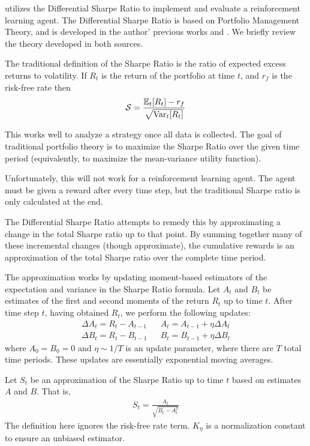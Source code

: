 \cite{drl_mvo} utilizes the Differential Sharpe Ratio to implement and evaluate a reinforcement learning agent.
The Differential Sharpe Ratio is based on Portfolio Management Theory, and is developed in the author' previous works \cite{diff_sharpe_ratio_paper} and \cite{diff_sharpe_ratio_book}.
We briefly review the theory developed in both sources.

The traditional definition of the Sharpe Ratio is the ratio of expected excess returns to volatility.
If $R_t$ is the return of the portfolio at time $t$, and $r_f$ is the risk-free rate then
\begin{align*}
  \mathcal{S} = \frac{\mathbb{E}_t[R_t] - r_f}{\sqrt{\operatorname{Var}_t[R_t]}}
\end{align*}

This works well to analyze a strategy once all data is collected.
The goal of traditional portfolio theory is to maximize the Sharpe Ratio over the given time period (equivalently,
to maximize the mean-variance utility function).

Unfortunately, this will not work for a reinforcement learning agent. The agent must be given a reward after every time step,
but the traditional Sharpe ratio is only calculated at the end.

The Differential Sharpe Ratio attempts to remedy this by approximating a change in the total Sharpe ratio up to that point.
By summing together many of these incremental changes (though approximate), the cumulative rewards is an approximation of the total
Sharpe ratio over the complete time period.

The approximation works by updating moment-based estimators of the expectation and variance in the Sharpe Ratio formula.
Let $A_t$ and $B_t$ be estimates of the first and second moments of the return $R_t$ up to time $t$.
After time step $t$, having obtained $R_t$, we perform the following updates:
\begin{align*}
  \Delta A_t = R_t - A_{t-1} && A_t = A_{t-1} + \eta \Delta A_t \\
  \Delta B_t = R_t - B_{t-1} && B_t = B_{t-1} + \eta \Delta B_t
\end{align*}
where $A_0 = B_0 = 0$ and $\eta \sim 1/T$ is an update parameter, where there are $T$ total time periods.
These updates are essentially exponential moving averages.

Let $S_t$ be an approximation of the Sharpe Ratio up to time $t$ based on estimates $A$ and $B$. That is,
\begin{align*}
  S_t = \frac{A_t}{\sqrt{B_t - A_t^2}}
\end{align*}
The definition here ignores the risk-free rate term. $K_\eta$ is a normalization constant to ensure an unbiased estimator.

